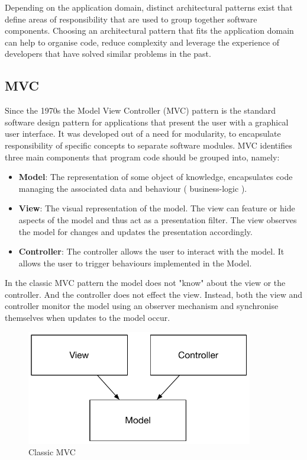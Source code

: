 Depending on the application domain, distinct architectural patterns exist that define areas of responsibility that are used to group together software components. Choosing an architectural pattern that fits the application domain can help to organise code, reduce complexity and leverage the experience of developers that have solved similar problems in the past.

\subsection{MVC}
Since the 1970s the Model View Controller (MVC) pattern is the standard software design pattern for applications that present the user with a graphical user interface. It was developed out of a need for modularity, to encapsulate responsibility of specific concepts to separate software modules. MVC identifies three main components that program code should be grouped into, namely\cite{walther_2016}:

\begin{itemize}[label={}]

\item \textbf{Model}: The representation of some object of knowledge, encapsulates code managing the associated data and behaviour ( business-logic ).
\item \textbf{View}: The visual representation of the model. The view can feature or hide aspects of the model and thus act as a presentation filter. The view observes the model for changes and updates the presentation accordingly.
\item \textbf{Controller}: The controller allows the user to interact with the model. It allows the user to trigger behaviours implemented in the Model.

\end{itemize}

In the classic MVC pattern the model does not "know" about the view or the controller. And the controller does not effect the view. Instead, both the view and controller monitor the model using an observer mechanism and synchronise themselves when updates to the model occur.

\begin{figure}[H]
    \centering
    \includegraphics[height=5cm,keepaspectratio]{assets/concept/mvc_1.pdf}
    \caption{Classic MVC}
    \label{fig:mvc_1}
\end{figure}

